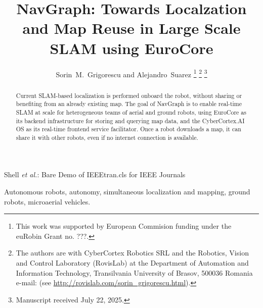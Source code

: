 \documentclass[journal]{IEEEtran}
\begin{document}
\title{NavGraph: Towards Localzation and Map Reuse in Large Scale SLAM using EuroCore}


\author{Sorin~M.~Grigorescu and Alejandro~Suarez%
\thanks{This work was supported by European Commision funding under the euRobin Grant no. ???.}
\thanks{The authors are with CyberCortex Robotics SRL and the Robotics, Vision and Control Laboratory (RovisLab) at the Department of Automation and Information Technology, Transilvania University of Brasov, 500036 Romania e-mail: (see \url{http://rovislab.com/sorin_grigorescu.html}).}%
\thanks{Manuscript received July 22, 2025.}}


\markboth{}%
{Shell \MakeLowercase{\textit{et al.}}: Bare Demo of IEEEtran.cls for IEEE Journals}

\maketitle

\begin{abstract}

Current SLAM-based localization is performed onboard the robot, without sharing or benefiting from an already existing map. The goal of NavGraph is to enable real-time SLAM at scale for heterogeneous teams of aerial and ground robots, using EuroCore as its backend infrastructure for storing and querying map data, and the CyberCortex.AI OS as its real-time frontend service facilitator.  Once a robot downloads a map, it can share it with other robots, even if no internet connection is available.

\end{abstract}

\begin{IEEEkeywords}
Autonomous robots, autonomy, simultaneous localization and mapping, ground robots, microaerial vehicles.
\end{IEEEkeywords}



%
\IEEEpeerreviewmaketitle
\end{document}
